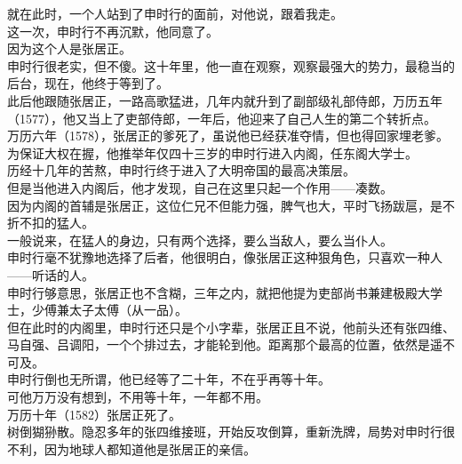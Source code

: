 \begin{multicols}{\theparacolNo}
就在此时，一个人站到了申时行的面前，对他说，跟着我走。\\

这一次，申时行不再沉默，他同意了。\\

因为这个人是张居正。\\

申时行很老实，但不傻。这十年里，他一直在观察，观察最强大的势力，最稳当的后台，现在，他终于等到了。\\

此后他跟随张居正，一路高歌猛进，几年内就升到了副部级礼部侍郎，万历五年（1577），他又当上了吏部侍郎，一年后，他迎来了自己人生的第二个转折点。\\

万历六年（1578），张居正的爹死了，虽说他已经获准夺情，但也得回家埋老爹。为保证大权在握，他推举年仅四十三岁的申时行进入内阁，任东阁大学士。\\

历经十几年的苦熬，申时行终于进入了大明帝国的最高决策层。\\

但是当他进入内阁后，他才发现，自己在这里只起一个作用——凑数。\\

因为内阁的首辅是张居正，这位仁兄不但能力强，脾气也大，平时飞扬跋扈，是不折不扣的猛人。\\

一般说来，在猛人的身边，只有两个选择，要么当敌人，要么当仆人。\\

申时行毫不犹豫地选择了后者，他很明白，像张居正这种狠角色，只喜欢一种人——听话的人。\\

申时行够意思，张居正也不含糊，三年之内，就把他提为吏部尚书兼建极殿大学士，少傅兼太子太傅（从一品）。\\

但在此时的内阁里，申时行还只是个小字辈，张居正且不说，他前头还有张四维、马自强、吕调阳，一个个排过去，才能轮到他。距离那个最高的位置，依然是遥不可及。\\

申时行倒也无所谓，他已经等了二十年，不在乎再等十年。\\

可他万万没有想到，不用等十年，一年都不用。\\

万历十年（1582）张居正死了。\\

树倒猢狲散。隐忍多年的张四维接班，开始反攻倒算，重新洗牌，局势对申时行很不利，因为地球人都知道他是张居正的亲信。\\


\end{multicols}
